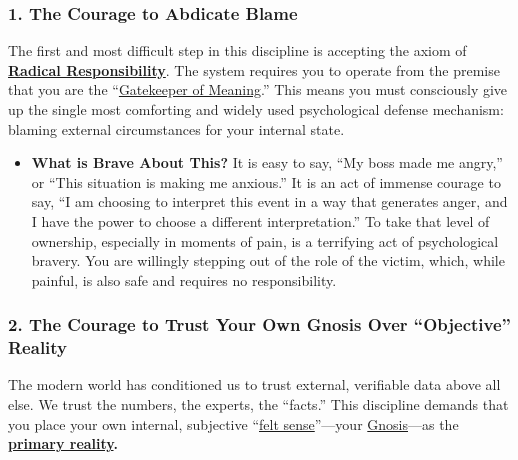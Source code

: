 \documentclass{article}
\begin{document}
\subsubsection*{1. The Courage to Abdicate Blame}\label{the-courage-to-abdicate-blame}

The first and most difficult step in this discipline is accepting the axiom of \textbf{\hyperlink{gloss:radical_responsibility}{Radical Responsibility}}. The system requires you to operate from the premise that you are the ``\hyperlink{gloss:gatekeeper_of_meaning}{Gatekeeper of Meaning}.'' This means you must consciously give up the single most comforting and widely used psychological defense mechanism: blaming external circumstances for your internal state.

\begin{itemize}
\item
  \textbf{What is Brave About This?} It is easy to say, ``My boss made me angry,'' or ``This situation is making me anxious.'' It is an act of immense courage to say, ``I am choosing to interpret this event in a way that generates anger, and I have the power to choose a different interpretation.'' To take that level of ownership, especially in moments of pain, is a terrifying act of psychological bravery. You are willingly stepping out of the role of the victim, which, while painful, is also safe and requires no responsibility.
\end{itemize}

\subsubsection*{2. The Courage to Trust Your Own Gnosis Over ``Objective'' Reality}\label{the-courage-to-trust-your-own-gnosis-over-objective-reality}

The modern world has conditioned us to trust external, verifiable data above all else. We trust the numbers, the experts, the ``facts.'' This discipline demands that you place your own internal, subjective ``\hyperlink{gloss:felt_sense}{felt sense}''---your \hyperlink{gloss:gnosis}{Gnosis}---as the \textbf{\hyperlink{gloss:primary_reality}{primary reality}.}
\end{document}
